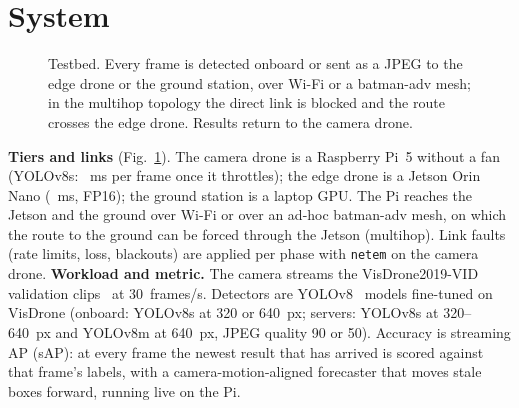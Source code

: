 \documentclass[conference]{IEEEtran}
\begin{document}
\section{System}\label{sec:system}
\begin{figure}[t]
\centering
{}
\caption{Testbed. Every frame is detected onboard or sent as a JPEG to the edge drone or the ground station, over Wi-Fi or
a batman-adv mesh; in the multihop topology the direct link is blocked and the route crosses the edge drone. Results
return to the camera drone.}
\label{fig:testbed}
\end{figure}
\textbf{Tiers and links} (Fig.~\ref{fig:testbed}). The camera drone is a Raspberry Pi~5 without a fan (YOLOv8s: \PiFullMs~ms per frame once it
throttles); the edge drone is a Jetson Orin Nano (\JetsonFullMs~ms, FP16); the ground station is a laptop GPU. The Pi
reaches the Jetson and the ground over Wi-Fi or over an ad-hoc batman-adv mesh, on which the route to the ground can be
forced through the Jetson (multihop). Link faults (rate limits, loss, blackouts) are applied per phase with
\texttt{netem} on the camera drone.
\textbf{Workload and metric.} The camera streams the VisDrone2019-VID validation clips~\cite{zhu2022visdrone} at
30~frames/s. Detectors are YOLOv8~\cite{jocher2023yolo} models fine-tuned on VisDrone (onboard: YOLOv8s at 320 or
640~px; servers: YOLOv8s at 320--640~px and YOLOv8m at 640~px, JPEG quality 90 or 50). Accuracy is streaming AP (sAP): at every frame
the newest result that has arrived is scored against that frame's labels, with a camera-motion-aligned forecaster that
moves stale boxes forward, running live on the Pi.
\end{document}
